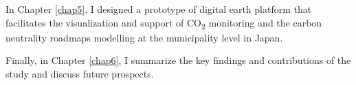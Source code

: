 In Chapter \ref{chap5}, I designed a prototype of digital earth platform that facilitates the visualization and support of CO\textsubscript{2} monitoring and the carbon neutrality roadmaps modelling at the municipality level in Japan. \par

Finally, in Chapter \ref{chap6}, I summarize the key findings and contributions of the study and discuss future prospects.\par